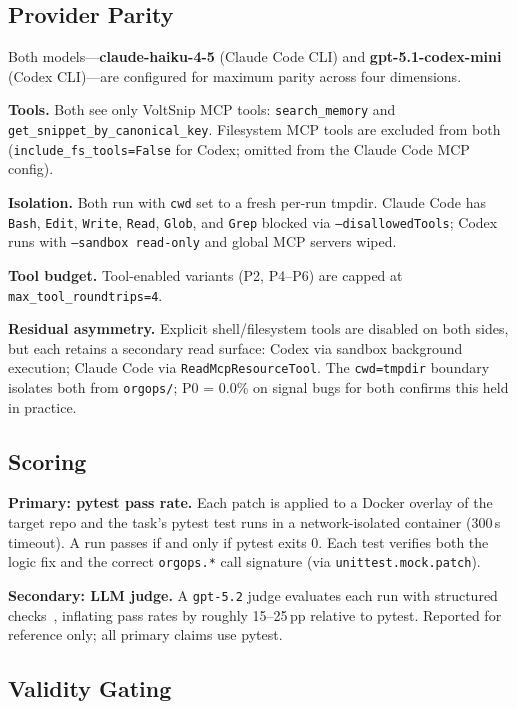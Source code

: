 \documentclass[10pt,a4paper,twocolumn]{article}
\begin{document}
\subsection{Provider Parity}
\label{sec:provider-parity}

Both models---\textbf{claude-haiku-4-5} (Claude Code CLI) and
\textbf{gpt-5.1-codex-mini} (Codex CLI)---are configured for maximum
parity across four dimensions.

\textbf{Tools.}
Both see only VoltSnip MCP tools: \texttt{search\_memory} and
\texttt{get\_snippet\_by\_canonical\_key}.
Filesystem MCP tools are excluded from both
(\texttt{include\_fs\_tools=False} for Codex; omitted from the Claude
Code MCP config).

\textbf{Isolation.}
Both run with \texttt{cwd} set to a fresh per-run tmpdir.
Claude Code has \texttt{Bash}, \texttt{Edit}, \texttt{Write},
\texttt{Read}, \texttt{Glob}, and \texttt{Grep} blocked via
\texttt{--disallowedTools}; Codex runs with \texttt{--sandbox read-only}
and global MCP servers wiped.

\textbf{Tool budget.}
Tool-enabled variants (P2, P4--P6) are capped at
\texttt{max\_tool\_roundtrips=4}.

\textbf{Residual asymmetry.}
Explicit shell/filesystem tools are disabled on both sides, but each
retains a secondary read surface: Codex via sandbox background execution;
Claude Code via \texttt{ReadMcpResourceTool}.
The \texttt{cwd=tmpdir} boundary isolates both from \texttt{orgops/};
P0 = 0.0\% on signal bugs for both confirms this held in practice.

\subsection{Scoring}
\label{sec:scoring}

\textbf{Primary: pytest pass rate.}
Each patch is applied to a Docker overlay of the target repo and the
task's pytest test runs in a network-isolated container (300\,s timeout).
A run passes if and only if pytest exits 0.
Each test verifies both the logic fix and the correct \texttt{orgops.*}
call signature (via \texttt{unittest.mock.patch}).

\textbf{Secondary: LLM judge.}
A \texttt{gpt-5.2} judge evaluates each run with structured
checks~\citep{li2024llmjudge}, inflating pass rates by roughly
15--25\,pp relative to pytest.
Reported for reference only; all primary claims use pytest.

\subsection{Validity Gating}
\label{sec:validity-gating}
\end{document}
